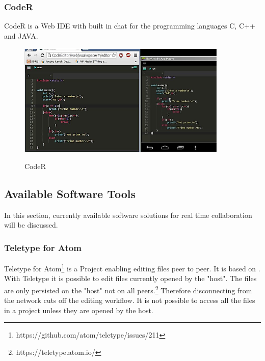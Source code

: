 \subsubsection{CodeR}
CodeR \cite{KurniawanSoesantoWijaya:2015:CodeR:Real-timeCodeEditorApplicationforCollaborativeProgramming} is a Web IDE with built in chat for the programming languages C, C++ and JAVA. 
\begin{figure}[hb]
    \centering
    \includegraphics[width=100mm]{figures/screenshots/CodeR.png}
	\caption{CodeR }
	\cite{KurniawanSoesantoWijaya:2015:CodeR:Real-timeCodeEditorApplicationforCollaborativeProgramming}
    \label{fig:touchdevelop}
\end{figure}

\newpage
\subsection{Available Software Tools}

In this section, currently available software solutions for real time collaboration will be discussed.

\subsubsection{Teletype for Atom}
Teletype for Atom\footnote{https://github.com/atom/teletype/issues/211} is a Project enabling editing files peer to peer. It is based on 	\cite{Oster:2006:DataconsistencyforP2Pcollaborativeediting} \cite{YuWeihai:2014} \cite{BriotUrsoShapiro:2016:HighResponsivenessGroupEditing}.
With Teletype it is possible to edit files currently opened by the "host". The files are only persisted on the "host" not on all peers.\footnote{https://teletype.atom.io/}
Therefore disconnecting from the network cuts off the editing workflow. It is not possible to access all the files in a project unless they are opened by the host. 
